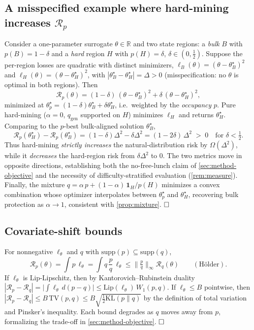 \documentclass{article}
\theoremstyle{plain}
\theoremstyle{definition}
\theoremstyle{remark}
\newcommand{\R}{\mathbb{R}}
\newcommand{\lossf}{\ell_\theta}
\newcommand{\pnat}{p}
\newcommand{\qtr}{q}
\newcommand{\qgen}{q_{\mathrm{gen}}}
\newcommand{\Rp}{\mathcal{R}_{\pnat}}
\newcommand{\Rq}{\mathcal{R}_{\qtr}}
\newcommand{\unif}{\alpha}
\newcommand{\Lip}{\mathrm{Lip}}
\begin{document}
\subsection{A misspecified example where hard-mining increases $\Rp$}\label{app:nofreelunch}
Consider a one-parameter surrogate $\theta\in\R$ and two state regions: a \emph{bulk} $B$ with
$\pnat(B)=1-\delta$ and a \emph{hard} region $H$ with $\pnat(H)=\delta$, $\delta\in(0,\tfrac12)$. Suppose
the per-region losses are quadratic with distinct minimizers,
$\ell_B(\theta)=(\theta-\theta_B^\star)^2$ and $\ell_H(\theta)=(\theta-\theta_H^\star)^2$, with
$|\theta_B^\star-\theta_H^\star|=\Delta>0$ (misspecification: no $\theta$ is optimal in both regions).
Then
\begin{equation}
  \Rp(\theta)=(1-\delta)\,(\theta-\theta_B^\star)^2+\delta\,(\theta-\theta_H^\star)^2,
\end{equation}
minimized at $\theta_\pnat^\star=(1-\delta)\theta_B^\star+\delta\theta_H^\star$, i.e.\ weighted by the
\emph{occupancy} $\pnat$. Pure hard-mining ($\unif=0$, $\qgen$ supported on $H$) minimizes $\ell_H$ and
returns $\theta_H^\star$. Comparing to the $\pnat$-best bulk-aligned solution $\theta_B^\star$,
\begin{equation}
  \Rp(\theta_H^\star)-\Rp(\theta_B^\star)
  = (1-\delta)\Delta^2 - \delta\Delta^2 = (1-2\delta)\,\Delta^2 \;>\;0
  \quad\text{for }\delta<\tfrac12 .
\end{equation}
Thus hard-mining \emph{strictly increases} the natural-distribution risk by $\Omega(\Delta^2)$, while it
\emph{decreases} the hard-region risk from $\delta\Delta^2$ to $0$. The two metrics move in opposite
directions, establishing both the no-free-lunch claim of \cref{sec:method-objective} and the necessity of
difficulty-stratified evaluation (\cref{rem:measure}). Finally, the mixture
$\qtr=\unif\,\pnat+(1-\unif)\,\mathbf{1}_H/\pnat(H)$ minimizes a convex combination whose optimizer
interpolates between $\theta_\pnat^\star$ and $\theta_H^\star$, recovering bulk protection as
$\unif\to1$, consistent with \cref{prop:mixture}. $\hfill\square$

\subsection{Covariate-shift bounds}\label{app:ipm}
For nonnegative $\lossf$ and $\qtr$ with $\mathrm{supp}(\pnat)\subseteq\mathrm{supp}(\qtr)$,
\[
  \Rp(\theta)=\int \pnat\,\lossf=\int \qtr\,\frac{\pnat}{\qtr}\,\lossf
  \le \Big\|\tfrac{\pnat}{\qtr}\Big\|_\infty \Rq(\theta)\qquad(\text{H\"older}).
\]
If $\lossf$ is $\Lip$-Lipschitz, then by Kantorovich--Rubinstein duality
$|\Rp-\Rq|=\big|\int \lossf\,d(\pnat-\qtr)\big|\le \Lip(\lossf)\,W_1(\pnat,\qtr)$. If $\lossf\le B$
pointwise, then $|\Rp-\Rq|\le B\,\mathrm{TV}(\pnat,\qtr)\le B\sqrt{\tfrac12\mathrm{KL}(\pnat\|\qtr)}$ by
the definition of total variation and Pinsker's inequality. Each bound degrades as $\qtr$ moves away from
$\pnat$, formalizing the trade-off in \cref{sec:method-objective}. $\hfill\square$
\end{document}
